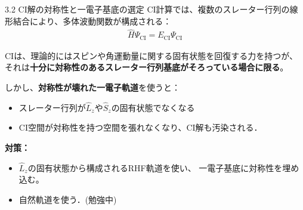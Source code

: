 \documentclass{beamer}
\begin{document}
\begin{frame}{3.2 CI解の対称性と一電子基底の選定}
  CI計算では、複数のスレーター行列の線形結合により、多体波動関数が構成される：
  \begin{align*}
  \hat{H} \Psi_{\text{CI}} = E_{\text{CI}} \Psi_{\text{CI}}
  \end{align*}
  
  \vspace{1em}
  CIは、理論的にはスピンや角運動量に関する固有状態を回復する力を持つが、
  それは\textbf{十分に対称性のあるスレーター行列基底がそろっている場合に限る}。
  
  \vspace{1em}
  しかし、\textbf{対称性が壊れた一電子軌道}を使うと：
  \begin{itemize}
    \item スレーター行列が$\hat{L}_z$や$\hat{S}_z$の固有状態でなくなる
    \item CI空間が対称性を持つ空間を張れなくなり、CI解も汚染される．
  \end{itemize}
  
  \vspace{1em}
  \textbf{対策：} 
  \begin{itemize}
    \item $\hat{L}_z$の固有状態から構成されるRHF軌道を使い、
  一電子基底に対称性を埋め込む。
    \item   自然軌道を使う．(勉強中)
  \end{itemize}
  \end{frame}
\end{document}

